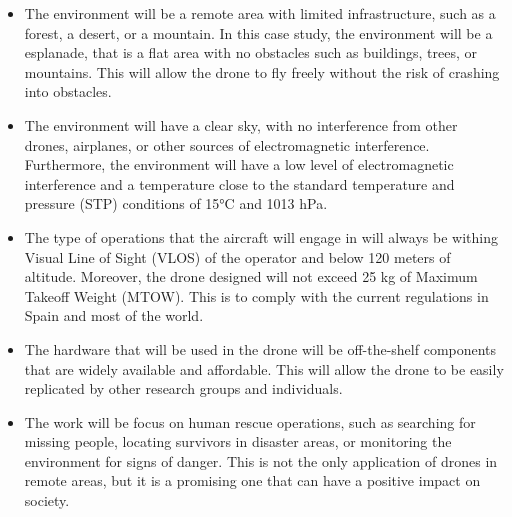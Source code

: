 \begin{itemize}
  \item The environment will be a remote area with limited infrastructure, such as a forest, a desert, or a mountain. In this case study, the environment will be a esplanade, that is a flat area with no obstacles such as buildings, trees, or mountains. This will allow the drone to fly freely without the risk of crashing into obstacles.

  \item The environment will have a clear sky, with no interference from other drones, airplanes, or other sources of electromagnetic interference. Furthermore, the environment will have a low level of electromagnetic interference and a temperature close to the standard temperature and pressure (STP) conditions of 15°C and 1013 hPa.

  \item The type of operations that the aircraft will engage in will always be withing Visual Line of Sight (VLOS) of the operator and below 120 meters of altitude. Moreover, the drone designed will not exceed 25 kg of Maximum Takeoff Weight (MTOW). This is to comply with the current regulations in Spain and most of the world.

  \item The hardware that will be used in the drone will be off-the-shelf components that are widely available and affordable. This will allow the drone to be easily replicated by other research groups and individuals.

  \item The work will be focus on human rescue operations, such as searching for missing people, locating survivors in disaster areas, or monitoring the environment for signs of danger. This is not the only application of drones in remote areas, but it is a promising one that can have a positive impact on society.
\end{itemize}
